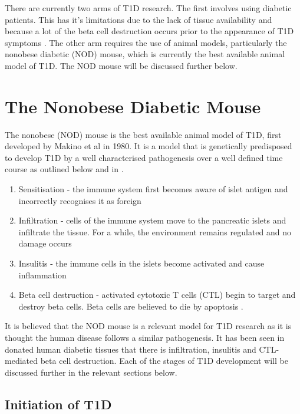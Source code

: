 There are currently two arms of T1D research.
The first involves using diabetic patients.
This has it's limitations due to the lack of tissue availability and because a lot of the beta cell destruction occurs prior to the appearance of T1D symptoms \citep{Thomas2000}.
The other arm requires the use of animal models, particularly the nonobese diabetic (NOD) mouse, which is currently the best available animal model of T1D.
The NOD mouse will be discussed further below.




\section{The Nonobese Diabetic Mouse}

The nonobese (NOD) mouse is the best available animal model of T1D, first developed by Makino et al  in 1980.
It is a model that is genetically predisposed to develop T1D by a well characterised pathogenesis over a well defined time course as outlined below and in .

\begin{enumerate}
\item Sensitisation - the immune system first becomes aware of islet antigen and incorrectly recognises it as foreign
\item Infiltration - cells of the immune system move to the pancreatic islets and infiltrate the tissue. For a while, the environment remains regulated and no damage occurs
\item Insulitis - the immune cells in the islets become activated and cause inflammation
\item Beta cell destruction - activated cytotoxic T cells (CTL) begin to target and destroy beta cells. Beta cells are believed to die by apoptosis \citep{Cnop2005}.
\end{enumerate}

It is believed that the NOD mouse is a relevant model for T1D research as it is thought the human disease follows a similar pathogenesis.
It has been seen in donated human diabetic tissues that there is infiltration, insulitis and CTL-mediated beta cell destruction.
Each of the stages of T1D development will be discussed further in the relevant sections below.


\subsection{Initiation of T1D}

